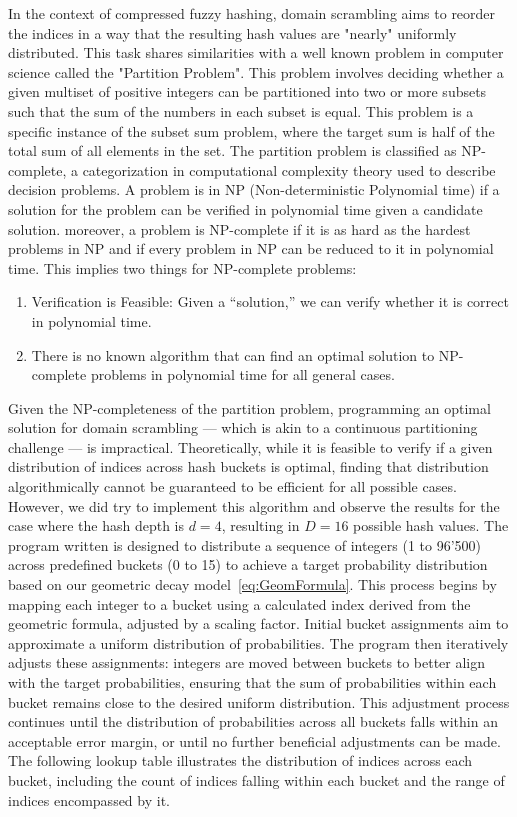 In the context of compressed fuzzy hashing, domain scrambling aims to reorder the indices in a way that the resulting hash values are "nearly" uniformly distributed. This task shares similarities with a well known problem in computer science called the "Partition Problem". This problem involves deciding whether a given multiset of positive integers can be partitioned into two or more subsets such that the sum of the numbers in each subset is equal. This problem is a specific instance of the subset sum problem, where the target sum is half of the total sum of all elements in the set. The partition problem is classified as NP-complete, a categorization in computational complexity theory used to describe decision problems. A problem is in NP (Non-deterministic Polynomial time) if a solution for the problem can be verified in polynomial time given a candidate solution. moreover, a problem is NP-complete if it is as hard as the hardest problems in NP and if every problem in NP can be reduced to it in polynomial time. This implies two things for NP-complete problems:

\begin{enumerate}
    \item Verification is Feasible: Given a ``solution,'' we can verify whether it is correct in polynomial time.
    \item There is no known algorithm that can find an optimal solution to NP-complete problems in polynomial time for all general cases.
\end{enumerate}

Given the NP-completeness of the partition problem, programming an optimal solution for domain scrambling — which is akin to a continuous partitioning challenge — is impractical. Theoretically, while it is feasible to verify if a given distribution of indices across hash buckets is optimal, finding that distribution algorithmically cannot be guaranteed to be efficient for all possible cases. However, we did try to implement this algorithm and observe the results for the case where the hash depth is \(d=4\), resulting in \(D=16\) possible hash values. The program written is designed to distribute a sequence of integers (1 to 96'500) across predefined buckets (0 to 15) to achieve a target probability distribution based on our geometric decay model~\ref{eq:GeomFormula}. This process begins by mapping each integer to a bucket using a calculated index derived from the geometric formula, adjusted by a scaling factor. Initial bucket assignments aim to approximate a uniform distribution of probabilities. The program then iteratively adjusts these assignments: integers are moved between buckets to better align with the target probabilities, ensuring that the sum of probabilities within each bucket remains close to the desired uniform distribution. This adjustment process continues until the distribution of probabilities across all buckets falls within an acceptable error margin, or until no further beneficial adjustments can be made. The following lookup table illustrates the distribution of indices across each bucket, including the count of indices falling within each bucket and the range of indices encompassed by it.




